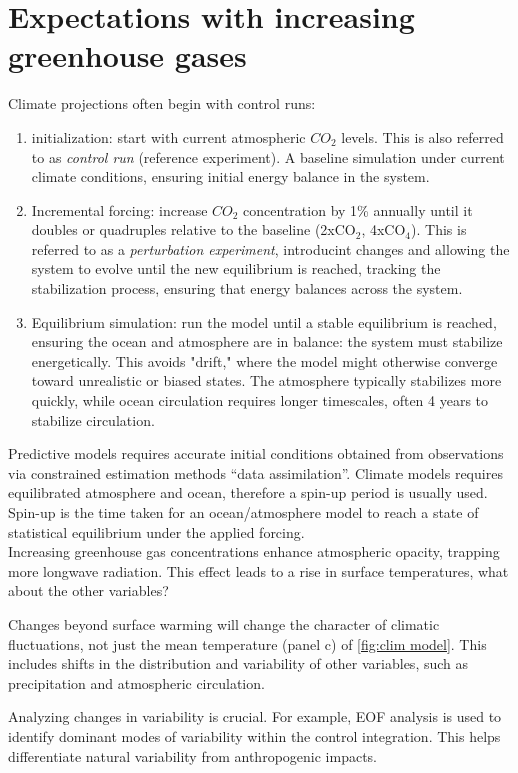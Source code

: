 \section{Expectations with increasing greenhouse gases}
Climate projections often begin with control runs:
\begin{enumerate}
	\item initialization: start with current atmospheric $CO_2$ levels. This is also referred to as \textit{control run} (reference experiment). A baseline simulation under current climate conditions, ensuring initial energy balance in the system.
	\item Incremental forcing: increase $CO_2$ concentration by 1\% annually until it doubles or quadruples relative to the baseline (2xCO$_2$, 4xCO$_4$). This is referred to as a \textit{perturbation experiment}, introducint changes and allowing the system to evolve until the new equilibrium is reached, tracking the stabilization process, ensuring that energy balances across the system.
	\item Equilibrium simulation: run the model until a stable equilibrium is reached, ensuring the ocean and atmosphere are in balance: the system must stabilize energetically. This avoids "drift," where the model might otherwise converge toward unrealistic or biased states. The atmosphere typically stabilizes more quickly, while ocean circulation requires longer timescales, often 4 years to stabilize circulation.
\end{enumerate}
Predictive models requires accurate initial conditions obtained
from observations via constrained estimation methods “data
assimilation”. Climate models requires equilibrated atmosphere and ocean, therefore a spin-up period is usually used. Spin-up is the time taken for an ocean/atmosphere model to reach a state of statistical equilibrium under the applied forcing.\\


Increasing greenhouse gas concentrations enhance atmospheric opacity, trapping more longwave radiation. This effect leads to a rise in surface temperatures, what about the other variables?

Changes beyond surface warming will change the character of climatic fluctuations, not just the mean temperature (panel c) of \ref{fig:clim model}. This includes shifts in the distribution and variability of other variables, such as precipitation and atmospheric circulation.



Analyzing changes in variability is crucial. For example, EOF analysis is used to identify dominant modes of variability within the control integration. This helps differentiate natural variability from anthropogenic impacts.
